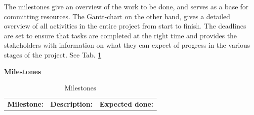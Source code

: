 The milestones give an overview of the work to be done, and serves as a base for committing resources. The Gantt-chart on the other hand, gives a detailed overview of all activities in the entire project from start to finish.  The deadlines are set to ensure that tasks are completed at the right time and provides the stakeholders with information on what they can expect of progress in the various stages of the project. See Tab. \ref{tab:milestones}\\
\begin{table}[h]
\begin{center}
\textbf{\Large Milestones}
\end{center}
\caption{Milestones}
\label{tab:milestones}
\begin{tabular}{llc}
\rowcolor{cadetgrey}
\centering \textbf{Milestone:}    &\textbf{Description:} 	 &\textbf{Expected done:} \\ %


\end{tabular}
\end{table}
